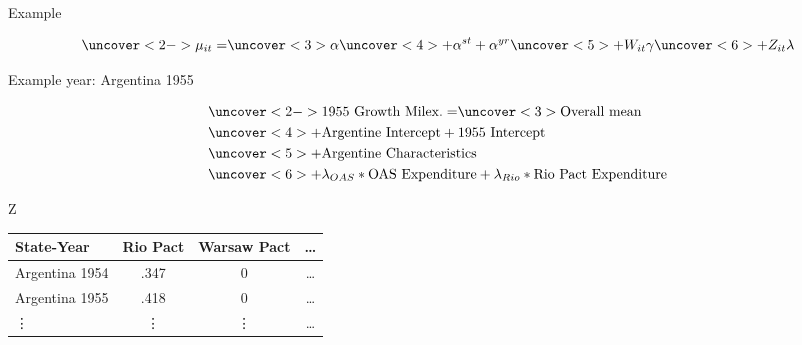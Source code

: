 \documentclass[12pt]{beamer}
\begin{document}
\begin{frame}{Example}


\begin{equation*}
\uncover<2->{\mu_{it} =} \uncover<3>{\alpha} \uncover<4>{+ \alpha^{st} + \alpha^{yr}} \uncover<5>{+ W_{it} \gamma} \uncover<6>{+ Z_{it} \lambda}
\end{equation*}

Example year: Argentina 1955

\begin{equation*}
\begin{split}
& \uncover<2->{\mbox{1955 Growth Milex.} = } \uncover<3>{\mbox{Overall mean}} \\
& \uncover<4>{+ \mbox{Argentine Intercept} + \mbox{1955 Intercept}} \\
& \uncover<5>{+ \mbox{Argentine Characteristics}} \\
& \uncover<6>{+ \lambda_{OAS} * \mbox{OAS Expenditure} + \lambda_{Rio} * \mbox{Rio Pact Expenditure}}
\end{split}
\end{equation*}



\end{frame}




\begin{frame}[standout]{Z} 

\begin{tabular}{lccc}
State-Year & Rio Pact & Warsaw Pact & \ldots \\
\hline
Argentina 1954 & .347 & 0 & \ldots \\
Argentina 1955 & .418  & 0 & \ldots  \\
 \vdots & \vdots & \vdots & \ldots  
\end{tabular}

 \end{frame}



\end{document}
